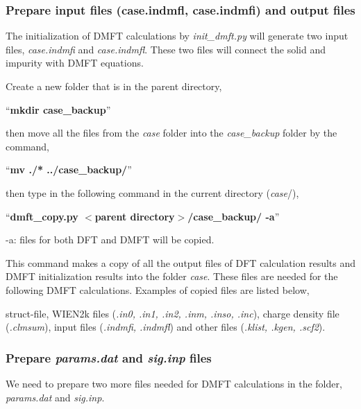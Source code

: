 \documentclass[12 pt]{article}
\begin{document}
	\subsubsection{Prepare input files (case.indmfl, case.indmfi) and output files}

  The initialization of DMFT calculations by \emph{init\_dmft.py} will generate two input files, \emph{case.indmfi} 
and \emph{case.indmfl}. These two files will connect the solid and impurity with DMFT equations. 

  Create a new folder that is in the parent directory, 

  ``\textbf{mkdir case\_backup}''

  then move all the files from the \emph{case} folder into the \emph{case\_backup} folder by the command,

  ``\textbf{mv ./* ../case\_backup/}''

  then type in the following command in the current directory (\emph{case}/),

  ``\textbf{dmft\_copy.py $<$parent directory$>$/case\_backup/ -a}''

  -a: files for both DFT and DMFT will be copied. 

  This command makes a copy of all the output files of DFT calculation results and DMFT initialization results 
into the folder \emph{case}. These files are needed for the following DMFT calculations. Examples of copied 
files are listed below,

  struct-file, WIEN2k files (\emph{.in0, .in1, .in2, .inm, .inso, .inc}), charge density file (\emph{.clmsum}), 
input files (\emph{.indmfi, .indmfl}) and other files (\emph{.klist, .kgen, .scf2}).

	\subsubsection{Prepare \emph{params.dat} and \emph{sig.inp} files}

  We need to prepare two more files needed for DMFT calculations in the folder, \emph{params.dat} and \emph{sig.inp}. 
\end{document}
